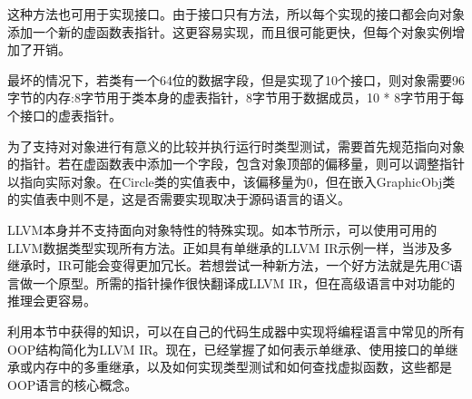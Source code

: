 这种方法也可用于实现接口。由于接口只有方法，所以每个实现的接口都会向对象添加一个新的虚函数表指针。这更容易实现，而且很可能更快，但每个对象实例增加了开销。

最坏的情况下，若类有一个64位的数据字段，但是实现了10个接口，则对象需要96字节的内存:8字节用于类本身的虚表指针，8字节用于数据成员，10 * 8字节用于每个接口的虚表指针。

为了支持对对象进行有意义的比较并执行运行时类型测试，需要首先规范指向对象的指针。若在虚函数表中添加一个字段，包含对象顶部的偏移量，则可以调整指针以指向实际对象。在Circle类的实值表中，该偏移量为0，但在嵌入GraphicObj类的实值表中则不是，这是否需要实现取决于源码语言的语义。

LLVM本身并不支持面向对象特性的特殊实现。如本节所示，可以使用可用的LLVM数据类型实现所有方法。正如具有单继承的LLVM IR示例一样，当涉及多继承时，IR可能会变得更加冗长。若想尝试一种新方法，一个好方法就是先用C语言做一个原型。所需的指针操作很快翻译成LLVM IR，但在高级语言中对功能的推理会更容易。

利用本节中获得的知识，可以在自己的代码生成器中实现将编程语言中常见的所有OOP结构简化为LLVM IR。现在，已经掌握了如何表示单继承、使用接口的单继承或内存中的多重继承，以及如何实现类型测试和如何查找虚拟函数，这些都是OOP语言的核心概念。

















































